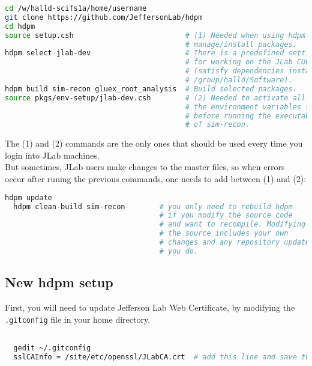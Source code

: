 \documentclass{article}
\begin{document}
\begin{lstlisting}[language=bash]
cd /w/halld-scifs1a/home/username     
git clone https://github.com/JeffersonLab/hdpm
cd hdpm
source setup.csh                          # (1) Needed when using hdpm to 
                                          # manage/install packages.
hdpm select jlab-dev                      # There is a predefined settings template 
                                          # for working on the JLab CUE
                                          # (satisfy dependencies installed at 
                                          # /group/halld/Software).
hdpm build sim-recon gluex_root_analysis  # Build selected packages.
source pkgs/env-setup/jlab-dev.csh        # (2) Needed to activate all
                                          # the environment variables set
                                          # before running the executables
                                          # of sim-recon.
\end{lstlisting}

The (1) and (2) commands are the only ones that should be used every time you login into JLab machines.\\
But sometimes, JLab users make changes to the master files, so when errors occur after runing the previous commands, one needs to add between (1) and (2):  

\begin{lstlisting}[language=bash]
  hdpm update
  hdpm clean-build sim-recon        # you only need to rebuild hdpm
                                    # if you modify the source code
                                    # and want to recompile. Modifying 
                                    # the source includes your own 
                                    # changes and any repository updates
                                    # you do.
 \end{lstlisting}

\subsection{New hdpm setup}

First, you will need to update Jefferson Lab Web Certificate, by modifying the \texttt{.gitconfig} file in your home directory.

\begin{lstlisting}[language=bash]

  gedit ~/.gitconfig
  sslCAInfo = /site/etc/openssl/JLabCA.crt  # add this line and save the file.

\end{lstlisting}
\end{document}
